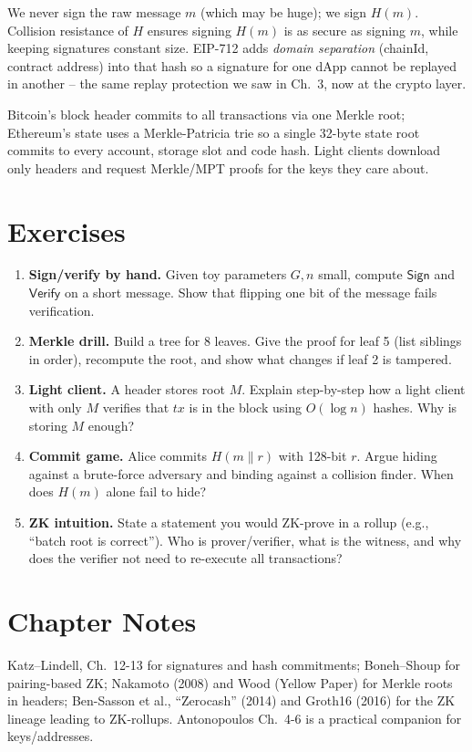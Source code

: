 \begin{remark}\label{rem:hash-sign}
We never sign the raw message $m$ (which may be huge); we sign $H(m)$. Collision resistance of $H$ ensures signing $H(m)$ is as secure as signing $m$, while keeping signatures constant size. EIP-712 adds \emph{domain separation} (chainId, contract address) into that hash so a signature for one dApp cannot be replayed in another -- the same replay protection we saw in Ch.~3, now at the crypto layer.
\end{remark}

\begin{example}\label{ex:merkle-wild}
Bitcoin's block header commits to all transactions via one Merkle root; Ethereum's state uses a Merkle-Patricia trie so a single 32-byte state root commits to every account, storage slot and code hash. Light clients download only headers and request Merkle/MPT proofs for the keys they care about.
\end{example}

\section{Exercises}\label{sec:ch05-exercises}
\begin{enumerate}[label=E5.\arabic*, leftmargin=*, itemsep=0.6em]
    \item \textbf{Sign/verify by hand.} Given toy parameters $G,n$ small, compute $\mathsf{Sign}$ and $\mathsf{Verify}$ on a short message. Show that flipping one bit of the message fails verification.
    \item \textbf{Merkle drill.} Build a tree for 8 leaves. Give the proof for leaf 5 (list siblings in order), recompute the root, and show what changes if leaf 2 is tampered.
    \item \textbf{Light client.} A header stores root $M$. Explain step-by-step how a light client with only $M$ verifies that $tx$ is in the block using $O(\log n)$ hashes. Why is storing $M$ enough?
    \item \textbf{Commit game.} Alice commits $H(m\parallel r)$ with 128-bit $r$. Argue hiding against a brute-force adversary and binding against a collision finder. When does $H(m)$ alone fail to hide?
    \item \textbf{ZK intuition.} State a statement you would ZK-prove in a rollup (e.g., ``batch root is correct''). Who is prover/verifier, what is the witness, and why does the verifier not need to re-execute all transactions?
\end{enumerate}

\section*{Chapter Notes}
Katz--Lindell, Ch.~12-13 for signatures and hash commitments; Boneh--Shoup for pairing-based ZK; Nakamoto (2008) and Wood (Yellow Paper) for Merkle roots in headers; Ben-Sasson et al., ``Zerocash'' (2014) and Groth16 (2016) for the ZK lineage leading to ZK-rollups. Antonopoulos Ch.~4-6 is a practical companion for keys/addresses.
